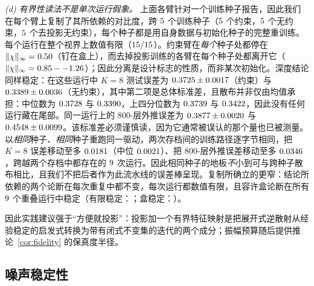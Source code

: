 \documentclass[UTF8,a4paper,11pt]{ctexart}
\newcommand{\infn}[1]{\lVert #1 \rVert_{\infty}}
\newcommand{\numv}[1]{#1}
\begin{document}
\emph{(d) 有界性读法不是单次运行假象。} 上面各臂针对一个训练种子报告，因此我们在每个臂上复制了其所依赖的对比度，跨 $\numv{\NumSeedNCons}$ 个训练种子（$\numv{\NumSeedNCons}$ 个约束，$\numv{\NumSeedNUnc}$ 个无约束，$\numv{\NumSeedNProjOff}$ 个去投影无约束），每个种子都是用自身数据与初始化种子的完整重训练。每个运行在整个视界上数值有限（$\numv{\NumSeedFinite}$）。约束臂在\emph{每个}种子处都停在 $\infn{\chi}=\numv{\NumSeedChiConsMax}$（钉在盒上），而去掉投影训练的各臂在每个种子处都离开它（$\infn{\chi}=\numv{\NumSeedProjOffBox}$）；因此分离是设计标志的性质，而非某次初始化。深度结论同样稳定：在这些运行中 $K{=}8$ 测试误差为 $\numv{\NumSeedRreMeanCons}\pm\numv{\NumSeedRreSdCons}$（约束）与 $\numv{\NumSeedRreMeanUnc}\pm\numv{\NumSeedRreSdUnc}$（无约束），其中第二项是总体标准差，且散布并非仅由均值承担：中位数为 $\numv{\NumSeedRreMedCons}$ 与 $\numv{\NumSeedRreMedUnc}$，上四分位数为 $\numv{\NumSeedRreHiCons}$ 与 $\numv{\NumSeedRreHiUnc}$，因此没有任何运行藏在尾部。同一运行上的 $800$-层外推误差为 $\numv{\NumSeedExMeanCons}\pm\numv{\NumSeedExSdCons}$ 与 $\numv{\NumSeedExMeanUnc}\pm\numv{\NumSeedExSdUnc}$。该标准差必须谨慎读，因为它通常被误认的那个量也已被测量。以\emph{相同}种子、\emph{相同}种子重跑同一驱动，两次存档间的训练路径逐字节相同，把 $K{=}8$ 误差移动至多 $\numv{\NumRepFloorMaxRre}$（中位 $\numv{\NumRepFloorMedRre}$）、把 $800$-层外推误差移动至多 $\numv{\NumRepFloorMaxExtrap}$，跨越两个存档中都存在的 $\numv{\NumRepNShared}$ 次运行。因此相同种子的地板\emph{不}小到可与跨种子散布相比，且我们不把后者作为此流水线的误差棒呈现。复制所确立的更窄：结论所依赖的两个论断在每次重复中都不变，每次运行都数值有限，且容许盒论断在所有 $\numv{\NumRepNShared}$ 个重叠运行中稳定（有限稳定：\numv{\NumRepFiniteStable}；盒稳定：\numv{\NumRepBoxStable}）。

因此实践建议强于“方便就投影”：投影加一个有界特征映射是把展开式逆散射从经验稳定的启发式转换为带有闭式不变集的迭代的两个成分；振幅预算随后提供推论~\ref{cor:fidelity} 的保真度半径。

\subsection{噪声稳定性}\label{sec:noise}
\end{document}
